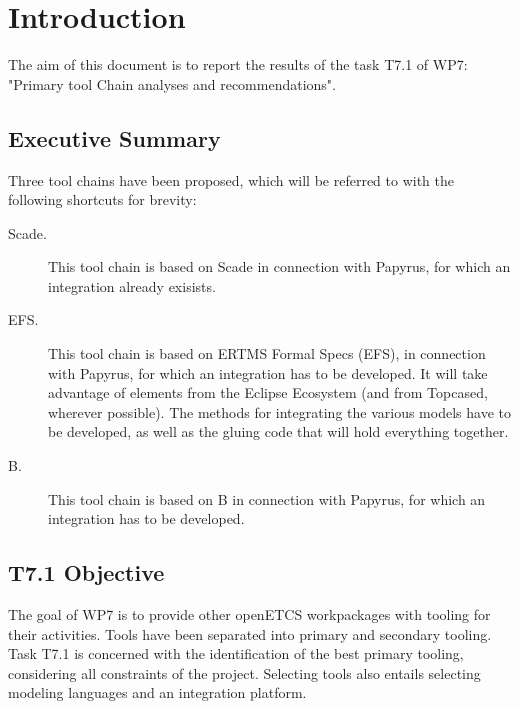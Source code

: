 

\chapter{Introduction}
\label{sec:intro}


The aim of this document is to report the results of the task T7.1 of WP7:  "Primary tool Chain analyses and recommendations".

\section{Executive Summary}

Three tool chains have been proposed, which will be referred to with the following shortcuts for brevity:

\begin{description}
\item[Scade.] This tool chain is based on Scade in connection with Papyrus, for which an integration already exisists.

\item[EFS.] This tool chain is based on ERTMS Formal Specs (EFS), in connection with Papyrus, for which an integration has to be developed.  It will take advantage of elements from the Eclipse Ecosystem (and from Topcased, wherever possible).  The methods for integrating the various models have to be developed, as well as the gluing code that will hold everything together.

\item[B.] This tool chain is based on B in connection with Papyrus, for which an integration has to be developed.

\end{description}

\section{T7.1 Objective}

The goal of WP7 is to provide other openETCS workpackages with tooling for their activities.  Tools have been separated into primary and secondary tooling.  Task T7.1 is concerned with the identification of the best primary tooling, considering all constraints of the project.  Selecting tools also entails selecting modeling languages and an integration platform.

